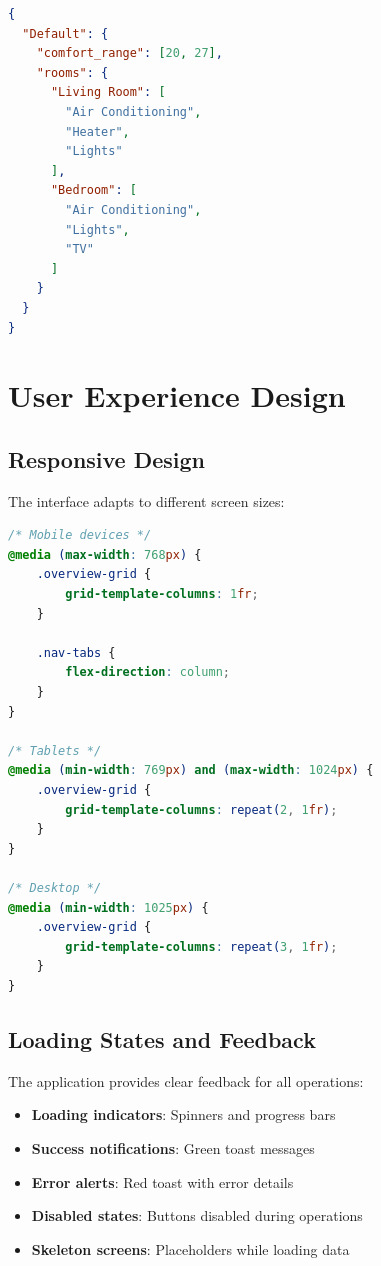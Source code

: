 \documentclass[12pt,a4paper]{article}
\begin{document}
\begin{lstlisting}[language=JSON, caption=homes.json structure]
{
  "Default": {
    "comfort_range": [20, 27],
    "rooms": {
      "Living Room": [
        "Air Conditioning",
        "Heater",
        "Lights"
      ],
      "Bedroom": [
        "Air Conditioning",
        "Lights",
        "TV"
      ]
    }
  }
}
\end{lstlisting}

\section{User Experience Design}

\subsection{Responsive Design}

The interface adapts to different screen sizes:

\begin{lstlisting}[language=CSS, caption=Responsive breakpoints]
/* Mobile devices */
@media (max-width: 768px) {
    .overview-grid {
        grid-template-columns: 1fr;
    }
    
    .nav-tabs {
        flex-direction: column;
    }
}

/* Tablets */
@media (min-width: 769px) and (max-width: 1024px) {
    .overview-grid {
        grid-template-columns: repeat(2, 1fr);
    }
}

/* Desktop */
@media (min-width: 1025px) {
    .overview-grid {
        grid-template-columns: repeat(3, 1fr);
    }
}
\end{lstlisting}

\subsection{Loading States and Feedback}

The application provides clear feedback for all operations:

\begin{itemize}[leftmargin=*]
    \item \textbf{Loading indicators}: Spinners and progress bars
    \item \textbf{Success notifications}: Green toast messages
    \item \textbf{Error alerts}: Red toast with error details
    \item \textbf{Disabled states}: Buttons disabled during operations
    \item \textbf{Skeleton screens}: Placeholders while loading data
\end{itemize}
\end{document}
